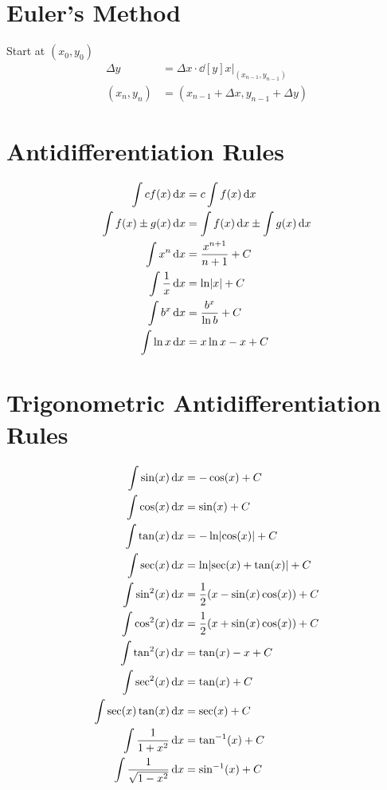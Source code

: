\documentclass[12pt]{article}
\DeclarePairedDelimiter\abs{\lvert}{\rvert}
\newcommand*{\asin}{\sin^{-1}}
\newcommand*{\atan}{\tan^{-1}}
\newcommand*{\D}[1]{\mathop{}\!\mathrm{d}#1}
\newcommand*{\fixmath}{%
  \makebox{}\vspace{\glueexpr-\baselineskip-\abovedisplayskip}}
\newenvironment{fixbskip}{\setlength{\belowdisplayskip}{0pt}\ignorespaces}%
  {\ignorespacesafterend}
\newenvironment{fixskip}{\setlength{\abovedisplayskip}{0pt}%
  \setlength{\belowdisplayskip}{0pt}\fixmath\ignorespaces}%
  {\ignorespacesafterend}
\begin{document}
\section*{Euler's Method}
Start at \((x_0,y_0)\)
\begin{fixbskip}
  \begin{align*}
    \Delta y &= \Delta x \cdot \dd[y]{x} \bigg|_{(x_{n-1},y_{n-1})}\\
    (x_n,y_n) &= (x_{n-1} + \Delta x, y_{n-1} + \Delta y)
  \end{align*}
\end{fixbskip}
\section*{Antidifferentiation Rules}
\begin{fixskip}
  \begin{align*}
    \int cf(x) \D{x} &= c \int f(x) \D{x}\\
    \int f(x) \pm g(x) \D{x} &= \int f(x) \D{x} \pm \int g(x) \D{x}\\
    \int x^n \D{x} &= \frac{x^{n+1}}{n+1} + C\\
    \int \frac{1}{x} \D{x} &= \ln\abs*{x} + C\\
    \int b^x \D{x} &= \frac{b^x}{\ln b} + C\\
    \int \ln x \D{x} &= x\ln x - x + C
  \end{align*}
\end{fixskip}
\section*{Trigonometric Antidifferentiation Rules}
\begin{fixskip}
  \begin{align*}
    \int \sin(x) \D{x} &= -\cos(x) + C\\
    \int \cos(x) \D{x} &= \sin(x) + C\\
    \int \tan(x) \D{x} &= -\ln\abs*{\cos(x)} + C\\
    \int \sec(x) \D{x} &= \ln\abs*{\sec(x)+\tan(x)} + C\\
    \int \sin^2(x) \D{x} &= \frac{1}{2} (x - \sin(x)\cos(x)) + C\\
    \int \cos^2(x) \D{x} &= \frac{1}{2} (x + \sin(x)\cos(x)) + C\\
    \int \tan^2(x) \D{x} &= \tan(x) - x + C\\
    \int \sec^2(x) \D{x} &= \tan(x) + C\\
    \int \sec(x) \tan(x) \D{x} &= \sec(x) + C\\
    \int \frac{1}{1+x^2} \D{x} &= \atan(x) + C\\
    \int \frac{1}{\sqrt{1-x^2}} \D{x} &= \asin(x) + C
  \end{align*}
\end{fixskip}
\end{document}
